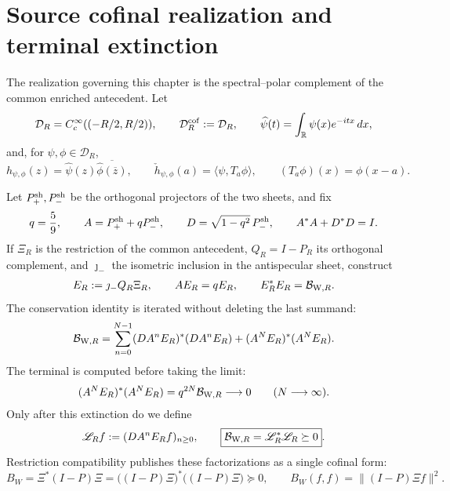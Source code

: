 \section*{Source cofinal realization and terminal extinction}

The realization governing this chapter is the spectral--polar complement of the common enriched antecedent. Let
\[
 \mathcal D_R=C_c^\infty((-R/2,R/2)),\qquad
 \mathcal D_R^{\rm cof}:=\mathcal D_R,\qquad
 \widehat\psi(t)=\int_{\mathbb R}\psi(x)e^{-itx}\,dx ,
\]
and, for \(\psi,\phi\in\mathcal D_R\),
\[
 h_{\psi,\phi}(z)
 =\widehat\psi(z)\overline{\widehat\phi(\overline z)},\qquad
 \check h_{\psi,\phi}(a)
 =\langle\psi,T_a\phi\rangle ,
 \qquad (T_a\phi)(x)=\phi(x-a).
\]

Let \(P_+^{\rm sh},P_-^{\rm sh}\) be the orthogonal projectors of the two sheets, and fix
\begin{equation}\label{eq:amp-rh-owner-q}
 q=\frac59,\qquad
 A=P_+^{\rm sh}+qP_-^{\rm sh},\qquad
 D=\sqrt{1-q^2}\,P_-^{\rm sh},\qquad A^*A+D^*D=I.
\end{equation}
If \(\Xi_R\) is the restriction of the common antecedent, \(Q_R=I-P_R\) its orthogonal complement, and \(\jmath_-\) the isometric inclusion in the antispecular sheet, construct
\begin{equation}\label{eq:amp-rh-owner-binding}
 E_R:=\jmath_-Q_R\Xi_R,\qquad
 AE_R=qE_R,\qquad
 E_R^*E_R=\mathcal B_{{\rm W},R}.
\end{equation}
The conservation identity is iterated without deleting the last summand:
\begin{equation}\label{eq:amp-rh-owner-telescopia}
 \mathcal B_{{\rm W},R}
 =\sum_{n=0}^{N-1}(DA^nE_R)^*(DA^nE_R)
 +(A^NE_R)^*(A^NE_R).
\end{equation}
The terminal is computed before taking the limit:
\begin{equation}\label{eq:amp-rh-owner-terminal}
 (A^NE_R)^*(A^NE_R)
 =q^{2N}\mathcal B_{{\rm W},R}\longrightarrow0
 \qquad(N\longrightarrow\infty).
\end{equation}
Only after this extinction do we define
\begin{equation}\label{eq:amp-rh-owner-l}
 \mathscr L_Rf:=(DA^nE_Rf)_{n\geq0},
 \qquad
 \boxed{\mathcal B_{{\rm W},R}=\mathscr L_R^*\mathscr L_R\succeq0}.
\end{equation}
Restriction compatibility publishes these factorizations as a single cofinal form:
\begin{equation}\label{eq:amp-rh-owner-publicacion}
 B_W=\Xi^*(I-P)\Xi
 =\bigl((I-P)\Xi\bigr)^*\bigl((I-P)\Xi\bigr)\succeq0,
 \qquad
 B_W(f,f)=\|(I-P)\Xi f\|^2.
\end{equation}

